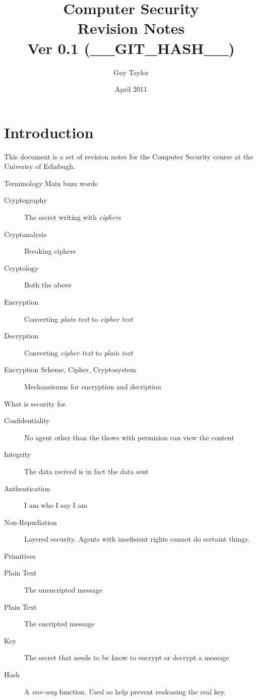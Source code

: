 \documentclass[11pt,twoside,a4paper]{article}
\begin{document}
  
  \graphicspath{{img//}}
  
  \title{Computer Security \\Revision Notes \\ Ver 0.1 (__GIT_HASH__)}
  \author{Guy Taylor}
  \date{April 2011}
  
  \maketitle
  
  \tableofcontents
  
  \section{Introduction}
    This document is a set of revision notes for the Computer Security \cite{cs_home} course at the Univerisy of Edinbugh.
  
  \clearpage
  
  \begin{section}{Terminology}
    Main buzz words
    \begin{description}
      \item[Cryptography] The secret writing with \emph{ciphers}
      \item[Cryptanalysis] Breaking ciphers
      \item[Cryptology] Both the above
      \item[Encryption] Converting \emph{plain text} to \emph{cipher text}
      \item[Decryption] Converting \emph{cipher text} to \emph{plain text}
      \item[Encryption Scheme, Cipher, Cryptosystem] Mechansisums for encryption and decription
    \end{description}
    
    What is security for
    \begin{description}
      \item[Confidentiality] No agent other than the thows with permision can view the content
      \item[Integrity] The data recived is in fact the data sent
      \item[Authentication] I am who I say I am
      \item[Non-Repudiation] Layered security. Agents with insefisient rights cannot do sertaint things.
    \end{description}
    
    
    Primitives
    \begin{description}
      \item[Plain Text] The unencripted message
      \item[Plain Text] The encripted message
      \item[Key] The secret that needs to be know to encrypt or decrypt a message
      \item[Hash] A \emph{one-way} function. Used so help prevent realeasing the real key.
    \end{description}
    
  \end{section}
  
\end{document}
